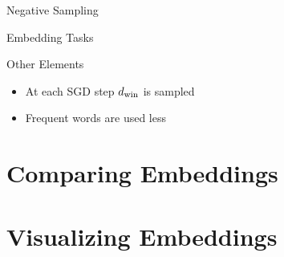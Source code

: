 \documentclass{beamer}
\begin{document}

\begin{frame}{Negative Sampling}
  
\end{frame}

\begin{frame}{Embedding Tasks}
  
\end{frame}

\begin{frame}{Other Elements}
  \begin{itemize}
  \item At each SGD step ${d_{\mathrm{win}}}$ is sampled 

  \item Frequent words are used less
  \end{itemize}  
\end{frame}

\section{Comparing Embeddings}

\begin{frame}
  
\end{frame}

\section{Visualizing Embeddings}

\begin{frame}
 
\end{frame}


\begin{frame}
  
\end{frame}
\end{document}
